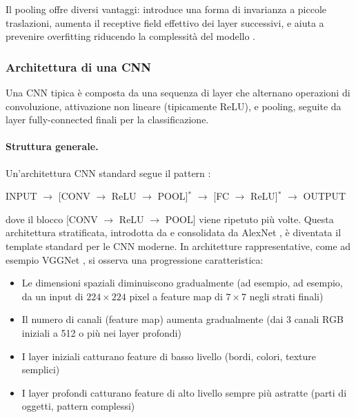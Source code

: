 Il pooling offre diversi vantaggi: introduce una forma di invarianza a piccole traslazioni, aumenta il receptive field effettivo dei layer successivi, e aiuta a prevenire overfitting riducendo la complessità del modello \cite{goodfellow2016deep}.

\subsubsection{Architettura di una CNN}

Una CNN tipica è composta da una sequenza di layer che alternano operazioni di convoluzione, attivazione non lineare (tipicamente ReLU), e pooling, seguite da layer fully-connected finali per la classificazione.

\paragraph{Struttura generale.} Un'architettura CNN standard segue il pattern \cite{goodfellow2016deep, lecun2015deep}:

\begin{center}
INPUT $\rightarrow$ [CONV $\rightarrow$ ReLU $\rightarrow$ POOL]$^*$ $\rightarrow$ [FC $\rightarrow$ ReLU]$^*$ $\rightarrow$ OUTPUT
\end{center}


dove il blocco [CONV $\rightarrow$ ReLU $\rightarrow$ POOL] viene ripetuto più volte. Questa architettura stratificata, introdotta da \cite{lecun1998gradient} e consolidata da AlexNet \cite{krizhevsky2012imagenet}, è diventata il template standard per le CNN moderne. In architetture rappresentative, come ad esempio VGGNet \cite{simonyan2014very}, si osserva una progressione caratteristica:

\begin{itemize}
\item Le dimensioni spaziali diminuiscono gradualmente (ad esempio, ad esempio, da un input di $224 \times 224$ pixel a feature map di $7 \times 7$ negli strati finali)
\item Il numero di canali (feature map) aumenta gradualmente (dai 3 canali RGB iniziali a 512 o più nei layer profondi)
\item I layer iniziali catturano feature di basso livello (bordi, colori, texture semplici)
\item I layer profondi catturano feature di alto livello sempre più astratte (parti di oggetti, pattern complessi)
\end{itemize}

